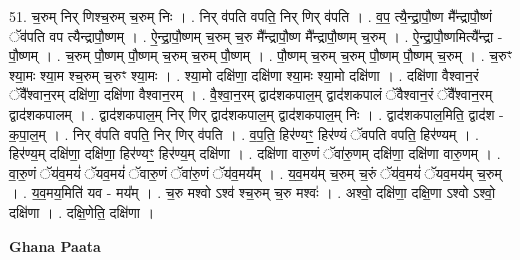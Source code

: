 \documentclass[17pt]{extarticle}
\begin{document}
51. च॒रुम् निर् णिश्च॒रुम् च॒रुम् निः । . निर् व॑पति वपति॒ निर् णिर् व॑पति । . व॒प॒ त्यै॒न्द्रा॒पौ॒ष्ण मै᳚न्द्रापौ॒ष्णं ॅव॑पति वप त्यैन्द्रापौ॒ष्णम् । . ऐ॒न्द्रा॒पौ॒ष्णम् च॒रुम् च॒रु मै᳚न्द्रापौ॒ष्ण मै᳚न्द्रापौ॒ष्णम् च॒रुम् । . ऐ॒न्द्रा॒पौ॒ष्णमित्यै᳚न्द्रा - पौ॒ष्णम् । . च॒रुम् पौ॒ष्णम् पौ॒ष्णम् च॒रुम् च॒रुम् पौ॒ष्णम् । . पौ॒ष्णम् च॒रुम् च॒रुम् पौ॒ष्णम् पौ॒ष्णम् च॒रुम् । . च॒रुꣳ श्या॒मः श्या॒म श्च॒रुम् च॒रुꣳ श्या॒मः । . श्या॒मो दक्षि॑णा॒ दक्षि॑णा श्या॒मः श्या॒मो दक्षि॑णा । . दक्षि॑णा वैश्वान॒रं ॅवै᳚श्वान॒रम् दक्षि॑णा॒ दक्षि॑णा वैश्वान॒रम् । . वै॒श्वा॒न॒रम् द्वाद॑शकपाल॒म् द्वाद॑शकपालं ॅवैश्वान॒रं ॅवै᳚श्वान॒रम् द्वाद॑शकपालम् । . द्वाद॑शकपाल॒म् निर् णिर् द्वाद॑शकपाल॒म् द्वाद॑शकपाल॒म् निः । . द्वाद॑शकपाल॒मिति॒ द्वाद॑श - क॒पा॒ल॒म् । . निर् व॑पति वपति॒ निर् णिर् व॑पति । . व॒प॒ति॒ हिर॑ण्यꣳ॒॒ हिर॑ण्यं ॅवपति वपति॒ हिर॑ण्यम् । . हिर॑ण्य॒म् दक्षि॑णा॒ दक्षि॑णा॒ हिर॑ण्यꣳ॒॒ हिर॑ण्य॒म् दक्षि॑णा । . दक्षि॑णा वारु॒णं ॅवा॑रु॒णम् दक्षि॑णा॒ दक्षि॑णा वारु॒णम् । . वा॒रु॒णं ॅय॑व॒मयं॑ ॅयव॒मयं॑ ॅवारु॒णं ॅवा॑रु॒णं ॅय॑व॒मय᳚म् । . य॒व॒मय॑म् च॒रुम् च॒रुं ॅय॑व॒मयं॑ ॅयव॒मय॑म् च॒रुम् । . य॒व॒मय॒मिति॑ यव - मय᳚म् । . च॒रु मश्वो ऽश्व॑ श्च॒रुम् च॒रु मश्वः॑ । . अश्वो॒ दक्षि॑णा॒ दक्षि॒णा ऽश्वो ऽश्वो॒ दक्षि॑णा । . दक्षि॒णेति॒ दक्षि॑णा । \newline

\textbf{Ghana Paata } \newline
\end{document}

